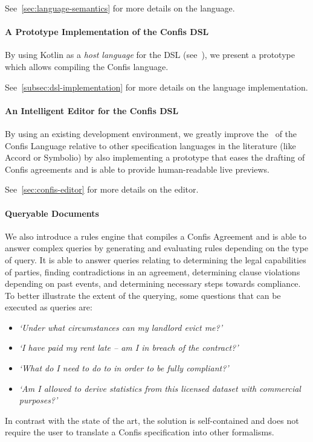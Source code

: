See~\autoref{sec:language-semantics} for more details on the language.

\paragraph{A Prototype Implementation of the Confis DSL}
By using Kotlin as a \emph{host language} for the DSL (see~), we present a prototype which allows compiling the Confis language.

See~\autoref{subsec:dsl-implementation} for more details on the language implementation.

\paragraph{An Intelligent Editor for the Confis DSL}
By using an existing development environment, we greatly improve the~ of the Confis Language relative to other specification languages in the literature (like Accord or Symbolio) by also implementing a prototype that eases the drafting of Confis agreements and is able to provide human-readable live previews.

See~\autoref{sec:confis-editor} for more details on the editor.

\paragraph{Queryable Documents} We also introduce a rules engine that compiles a Confis Agreement and is able to answer complex queries by generating and evaluating rules depending on the type of query.
It is able to answer queries relating to determining the legal capabilities of parties, finding contradictions in an agreement, determining clause violations depending on past events, and determining necessary steps towards compliance.
To better illustrate the extent of the querying, some questions that can be executed as queries are:
\begin{itemize}
    \item \emph{`Under what circumstances can my landlord evict me?'}
    \item \emph{`I have paid my rent late -- am I in breach of the contract?'}
    \item \emph{`What do I need to do to in order to be fully compliant?'}
    \item \emph{`Am I allowed to derive statistics from this licensed dataset with commercial purposes?'}
\end{itemize}
In contrast with the state of the art, the solution is self-contained and does not require the user to translate a Confis specification into other formalisms.

